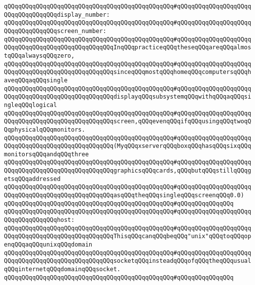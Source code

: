 \verb|qQQqqQQqqQQqqQQqqQQqqQQqqQQqqQQqqQQqqQQqqQQqqQQq#qQQqqQQqqQQqqQQqqQQqqQQqqQQqqQQqqQQqdisplay_number:|\newline
\verb|qQQqqQQqqQQqqQQqqQQqqQQqqQQqqQQqqQQqqQQqqQQqqQQq#qQQqqQQqqQQqqQQqqQQqqQQqqQQqqQQqqQQqscreen_number:|\newline
\verb|qQQqqQQqqQQqqQQqqQQqqQQqqQQqqQQqqQQqqQQqqQQqqQQq#qQQqqQQqqQQqqQQqqQQqqQQqqQQqqQQqqQQqqQQqqQQqqQQqqQQqInqQQqpracticeqQQqtheseqQQqareqQQqalmostqQQqalwaysqQQqzero,|\newline
\verb|qQQqqQQqqQQqqQQqqQQqqQQqqQQqqQQqqQQqqQQqqQQqqQQq#qQQqqQQqqQQqqQQqqQQqqQQqqQQqqQQqqQQqqQQqqQQqqQQqqQQqsinceqQQqmostqQQqhomeqQQqcomputersqQQqhaveqQQqaqQQqsingle|\newline
\verb|qQQqqQQqqQQqqQQqqQQqqQQqqQQqqQQqqQQqqQQqqQQqqQQq#qQQqqQQqqQQqqQQqqQQqqQQqqQQqqQQqqQQqqQQqqQQqqQQqqQQqdisplayqQQqsubsystemqQQqwithqQQqaqQQqsingleqQQqlogical|\newline
\verb|qQQqqQQqqQQqqQQqqQQqqQQqqQQqqQQqqQQqqQQqqQQqqQQq#qQQqqQQqqQQqqQQqqQQqqQQqqQQqqQQqqQQqqQQqqQQqqQQqqQQqscreen,qQQqevenqQQqifqQQqusingqQQqtwoqQQqphysicalqQQqmonitors.|\newline
\verb|qQQqqQQqqQQqqQQqqQQqqQQqqQQqqQQqqQQqqQQqqQQqqQQq#qQQqqQQqqQQqqQQqqQQqqQQqqQQqqQQqqQQqqQQqqQQqqQQqqQQq(MyqQQqxserverqQQqboxqQQqhasqQQqsixqQQqmonitorsqQQqandqQQqthree|\newline
\verb|qQQqqQQqqQQqqQQqqQQqqQQqqQQqqQQqqQQqqQQqqQQqqQQq#qQQqqQQqqQQqqQQqqQQqqQQqqQQqqQQqqQQqqQQqqQQqqQQqqQQqgraphicsqQQqcards,qQQqbutqQQqstillqQQqgetsqQQqaddressed|\newline
\verb|qQQqqQQqqQQqqQQqqQQqqQQqqQQqqQQqqQQqqQQqqQQqqQQq#qQQqqQQqqQQqqQQqqQQqqQQqqQQqqQQqqQQqqQQqqQQqqQQqqQQqasqQQqtheqQQqsingleqQQqscreenqQQq0.0)|\newline
\verb|qQQqqQQqqQQqqQQqqQQqqQQqqQQqqQQqqQQqqQQqqQQqqQQq#qQQqqQQqqQQqqQQq|\newline
\verb|qQQqqQQqqQQqqQQqqQQqqQQqqQQqqQQqqQQqqQQqqQQqqQQq#qQQqqQQqqQQqqQQqqQQqqQQqqQQqqQQqqQQqhost:|\newline
\verb|qQQqqQQqqQQqqQQqqQQqqQQqqQQqqQQqqQQqqQQqqQQqqQQq#qQQqqQQqqQQqqQQqqQQqqQQqqQQqqQQqqQQqqQQqqQQqqQQqqQQqThisqQQqcanqQQqbeqQQq"unix"qQQqtoqQQqopenqQQqaqQQqunixqQQqdomain|\newline
\verb|qQQqqQQqqQQqqQQqqQQqqQQqqQQqqQQqqQQqqQQqqQQqqQQq#qQQqqQQqqQQqqQQqqQQqqQQqqQQqqQQqqQQqqQQqqQQqqQQqqQQqsocketqQQqinsteadqQQqofqQQqtheqQQqusualqQQqinternetqQQqdomainqQQqsocket.|\newline
\verb|qQQqqQQqqQQqqQQqqQQqqQQqqQQqqQQqqQQqqQQqqQQqqQQq#qQQqqQQqqQQqqQQq|\newline
